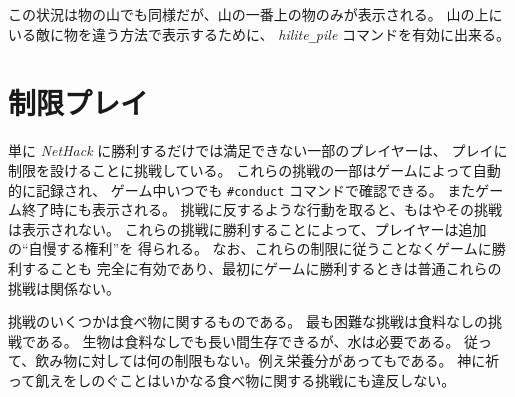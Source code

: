 この状況は物の山でも同様だが、山の一番上の物のみが表示される。
山の上にいる敵に物を違う方法で表示するために、
{\it hilite\verb+_+pile\/} コマンドを有効に出来る。

\section{制限プレイ}

単に {\it NetHack\/} に勝利するだけでは満足できない一部のプレイヤーは、
プレイに制限を設けることに挑戦している。
これらの挑戦の一部はゲームによって自動的に記録され、
ゲーム中いつでも {\tt \#conduct} コマンドで確認できる。
またゲーム終了時にも表示される。
挑戦に反するような行動を取ると、もはやその挑戦は表示されない。
これらの挑戦に勝利することによって、プレイヤーは追加の``自慢する権利''を
得られる。
なお、これらの制限に従うことなくゲームに勝利することも
完全に有効であり、最初にゲームに勝利するときは普通これらの挑戦は関係ない。

挑戦のいくつかは食べ物に関するものである。
最も困難な挑戦は食料なしの挑戦である。
生物は食料なしでも長い間生存できるが、水は必要である。
従って、飲み物に対しては何の制限もない。例え栄養分があってもである。
神に祈って飢えをしのぐことはいかなる食べ物に関する挑戦にも違反しない。

